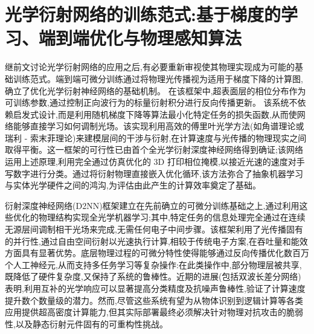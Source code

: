 \section{光学衍射网络的训练范式:基于梯度的学习、端到端优化与物理感知算法}\label{ux5149ux5b66ux884dux5c04ux7f51ux7edcux7684ux8badux7ec3ux8303ux5f0fux57faux4e8eux68afux5ea6ux7684ux5b66ux4e60ux7aefux5230ux7aefux4f18ux5316ux4e0eux7269ux7406ux611fux77e5ux7b97ux6cd5}

继前文讨论光学衍射网络的应用之后,有必要重新审视使其物理实现成为可能的基础训练范式。端到端可微分训练通过将物理光传播视为适用于梯度下降的计算图,确立了优化光学衍射神经网络的基础机制。\citep{doi_10_1145_3508352_3549378_13c53996} \citep{doi_10_1364_oe_533298_571e0aea} 在该框架中,超表面层的相位分布作为可训练参数,通过控制正向波行为的标量衍射积分进行反向传播更新。\citep{doi_10_1117_12_3056838_7df913be} 该系统不依赖启发式设计,而是利用随机梯度下降等算法最小化特定任务的损失函数,从而使网络能够直接学习如何调制光场。该实现利用高效的傅里叶光学方法(如角谱理论或瑞利 - 索末菲理论)来建模层间的干涉与衍射,在计算速度与光传播的物理现实之间取得平衡。这一框架的可行性已由首个全光学衍射深度神经网络得到确证;该网络运用上述原理,利用完全通过仿真优化的 3D 打印相位掩模,以接近光速的速度对手写数字进行分类。通过将衍射物理直接嵌入优化循环,该方法弥合了抽象机器学习与实体光学硬件之间的鸿沟,为评估由此产生的计算效率奠定了基础。\citep{s2_f7b7631268f17b1f868015df0bd08ef57904024d_011f3a59} \citep{doi_10_3390_nano14221812_4d7d91b1} \citep{doi_10_1038_s41598_022_19973_0_e156e6e2} \citep{doi_10_3390_life13051148_9434b5b6} \citep{doi_10_1364_josab_497148_b087424b}

衍射深度神经网络(D2NN)框架建立在先前确立的可微分训练基础之上,通过利用这些优化的物理结构实现全光学机器学习;其中,特定任务的信息处理完全通过在连续无源层间调制相干光场来完成,无需任何电子中间步骤。该框架利用了光传播固有的并行性,通过自由空间衍射以光速执行计算,相较于传统电子方案,在吞吐量和能效方面具有显著优势。底层物理过程的可微分特性使得能够通过反向传播优化数百万个人工神经元,从而支持多任务学习等复杂操作:在此类操作中,部分物理层被共享,既降低了硬件复杂度,又保持了系统的鲁棒性。近期的进展(包括双波长差分网络)表明,利用互补的光学响应可以显著提高分类精度及抗噪声鲁棒性,验证了计算速度提升数个数量级的潜力。然而,尽管这些系统有望为从物体识别到逻辑计算等各类应用提供超高密度计算能力,但其实际部署最终必须解决针对物理对抗攻击的脆弱性,以及静态衍射元件固有的可重构性挑战。\citep{doi_10_1515_nanoph_2023_0760_2c3ec088} \citep{s2_88f87b34acdb11cf20ad16d6fbdd5399e8617f8f_a548a720} \citep{doi_10_1002_lpor_202500433_c50e8d3b} \citep{doi_10_1109_dac18074_2021_9586204_0c48190f}

